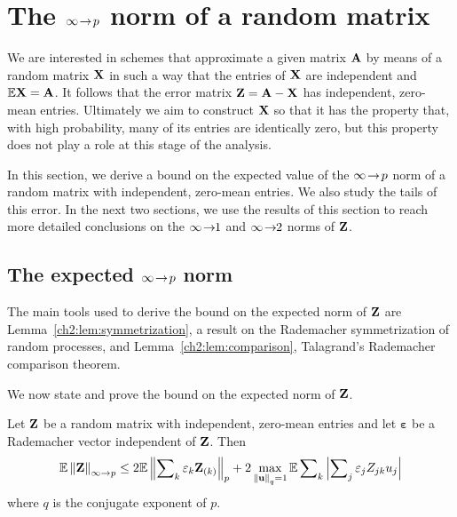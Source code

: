 \section{The $\infty\!\rightarrow\!p$ norm of a random matrix}
\label{ch2:sec:inftopbound}

We are interested in schemes that approximate a given matrix $\mathbf{A}$ by means
of a random matrix $\mathbf{X}$ in such a way that the entries of $\mathbf{X}$ are
independent and $\mathbb{E}\mathbf{X} = \mathbf{A}$. It follows that the error matrix
$\mathbf{Z}=\mathbf{A}-\mathbf{X}$ has independent, zero-mean entries. Ultimately 
we aim to construct $\mathbf{X}$ so that it has the property that, with high probability,
many of its entries are identically zero, but this property does not play
a role at this stage of the analysis.

In this section, we derive a bound on the expected value of the $\infty\!\rightarrow\!p$ norm of
a random matrix with independent, zero-mean entries. We also study the tails of
this error. In the next two sections, we use the results of this section to
reach more detailed conclusions on the $\infty\!\rightarrow\!\!1$ and $\infty\!\rightarrow\!\!2$ norms of
$\mathbf{Z}$.

\subsection{The expected $\infty\!\rightarrow\!p$ norm} 
The main tools used to derive the bound on the
expected norm of $\mathbf{Z}$ are Lemma~\ref{ch2:lem:symmetrization},
a result on the Rademacher symmetrization of random processes, and 
Lemma~\ref{ch2:lem:comparison}, Talagrand's Rademacher comparison theorem.

We now state and prove the bound on the expected norm of $\mathbf{Z}$.
\begin{thm}
Let $\mathbf{Z}$ be a random matrix with independent, zero-mean entries and let
$\boldsymbol{\varepsilon}$ be a Rademacher vector independent of $\mathbf{Z}$. Then
\[
\mathbb{E}\left\|\mathbf{Z}\right\|_{\infty\rightarrow p} \leq 2\mathbb{E}\left\|\sum\nolimits_k
\varepsilon_k \mathbf{Z}_{(k)}\right\|_p + 2 \max_{\left\|\mathbf{u}\right\|_q = 1} \mathbb{E}\sum\nolimits_k
\left|\sum\nolimits_j \varepsilon_j Z_{jk} u_j \right|
\]
where $q$ is the conjugate exponent of $p$.
\label{ch2:thm:inftopbound}
\end{thm}

